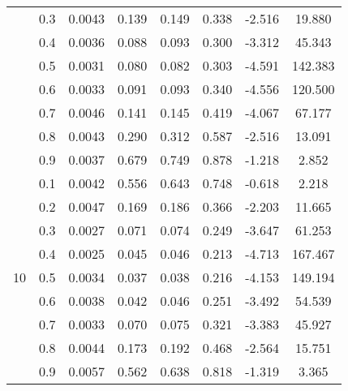 \documentclass[11pt,a4paper]{report}
\begin{document}
\begin{longtable}{ | c | c || c | c | c | c | c | c | }
 & 0.3 & 0.0043 & 0.139 & 0.149 & 0.338 & -2.516 & 19.880 \\
 & 0.4 & 0.0036 & 0.088 & 0.093 & 0.300 & -3.312 & 45.343 \\
 & 0.5 & 0.0031 & 0.080 & 0.082 & 0.303 & -4.591 & 142.383 \\
 & 0.6 & 0.0033 & 0.091 & 0.093 & 0.340 & -4.556 & 120.500 \\
 & 0.7 & 0.0046 & 0.141 & 0.145 & 0.419 & -4.067 & 67.177 \\
 & 0.8 & 0.0043 & 0.290 & 0.312 & 0.587 & -2.516 & 13.091 \\
 & 0.9 & 0.0037 & 0.679 & 0.749 & 0.878 & -1.218 & 2.852 \\
 \hline
\multirow{9}{*}{10} & 0.1 & 0.0042 & 0.556 & 0.643 & 0.748 & -0.618 & 2.218 \\
 & 0.2 & 0.0047 & 0.169 & 0.186 & 0.366 & -2.203 & 11.665 \\
 & 0.3 & 0.0027 & 0.071 & 0.074 & 0.249 & -3.647 & 61.253 \\
 & 0.4 & 0.0025 & 0.045 & 0.046 & 0.213 & -4.713 & 167.467 \\
 & 0.5 & 0.0034 & 0.037 & 0.038 & 0.216 & -4.153 & 149.194 \\
 & 0.6 & 0.0038 & 0.042 & 0.046 & 0.251 & -3.492 & 54.539 \\
 & 0.7 & 0.0033 & 0.070 & 0.075 & 0.321 & -3.383 & 45.927 \\
 & 0.8 & 0.0044 & 0.173 & 0.192 & 0.468 & -2.564 & 15.751 \\
 & 0.9 & 0.0057 & 0.562 & 0.638 & 0.818 & -1.319 & 3.365 \\
 \hline
\hline
\end{longtable}
\end{document}
